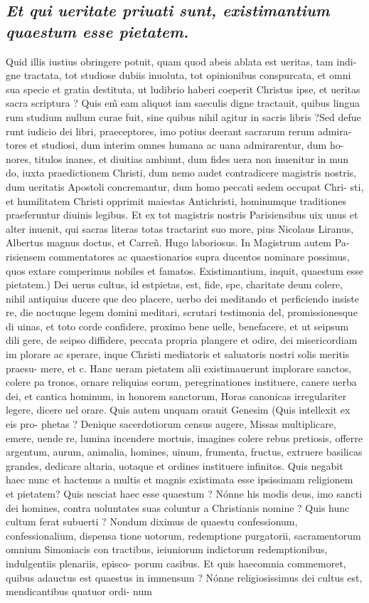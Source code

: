 \documentclass{article}
\begin{document}
\begin{pages}
\subsection*{\textit{Et qui ueritate priuati sunt, existimantium quaestum esse pietatem. }}\pstart Quid illis iustius obringere potuit, quam quod abeis ablata est ueritas, tam indi- gne tractata, tot studiose dubiis inuoluta, tot opinionibus conspurcata, et omni sua specie et gratia destituta, ut ludibrio haberi coeperit Christus ipse, et ueritas sacra scriptura ? Quis em̃ eam aliquot iam saeculis digne tractauit, quibus lingua rum studium nullum curae fuit, sine quibus nihil agitur in sacris libris ?Sed defue runt iudicio dei libri, praeceptores, imo potius deerant sacrarum rerum admira- tores et studiosi, dum interim omnes humana ac uana admirarentur, dum ho- nores, titulos inanes, et diuitias ambiunt, dum fides uera non inuenitur in mun do, iuxta praedictionem Christi, dum nemo audet contradicere magistris nostris, dum ueritatis Apostoli concremantur, dum homo peccati sedem occupat Chri- sti, et humilitatem Christi opprimit maiestas Antichristi, hominumque traditiones praeferuntur diuinis legibus. Et ex tot magistris nostris Parisiensibus uix unus et alter inuenit, qui sacras literas totas tractarint suo more, pius Nicolaus Liranus, Albertus magnus doctus, et Carreñ. Hugo laboriosus. In Magistrum autem Pa- risiensem commentatores ac quaestionarios supra ducentos nominare possimus, quos extare comperimus nobiles et famatos. Existimantium, inquit, quaestum esse pietatem.) Dei uerus cultus, id estpietas, est, fide, spe, charitate deum colere, nihil antiquius ducere que deo placere, uerbo dei meditando et perficiendo insiste re, die noctuque legem domini meditari, scrutari testimonia del, promissionesque di uinas, et toto corde confidere, proximo bene uelle, benefacere, et ut seipsum dili gere, de seipso diffidere, peccata propria plangere et odire, dei misericordiam im plorare ac sperare, inque Christi mediatoris et saluatoris nostri solis meritis praesu- mere, et c. Hanc ueram pietatem alii existimauerunt implorare sanctos, colere pa tronos, ornare reliquias eorum, peregrinationes instituere, canere uerba dei, et cantica hominum, in honorem sanctorum, Horas canonicas irregulariter legere, dicere uel orare. Quis autem unquam orauit Genesim (Quis intellexit ex eis pro- phetas ? Denique sacerdotiorum census augere, Missas multiplicare, emere, uende re, lumina incendere mortuis, imagines colere rebus pretiosis, offerre argentum, aurum, animalia, homines, uinum, frumenta, fructus, extruere basilicas grandes, dedicare altaria, uotaque et ordines instituere infinitos. Quis negabit haec nunc et hactenus a multis et magnis existimata esse ipsissimam religionem et pietatem? Quis nesciat haec esse quaestum ? Nónne his modis deus, imo sancti dei homines, contra uoluntates suas coluntur a Christianis nomine ? Quis hunc cultum ferat subuerti ? Nondum diximus de quaestu confessionum, confessionalium, dispensa tione uotorum, redemptione purgatorii, sacramentorum omnium Simoniacis con tractibus, ieiuniorum indictorum redemptionibus, indulgentiis plenariis, episco- porum casibus. Et quis haecomnia commemoret, quibus adauctus est quaestus in immensum ? Nónne religiosissimus dei cultus est, mendicantibus quatuor ordi- num 
\end{pages}
\end{document}
